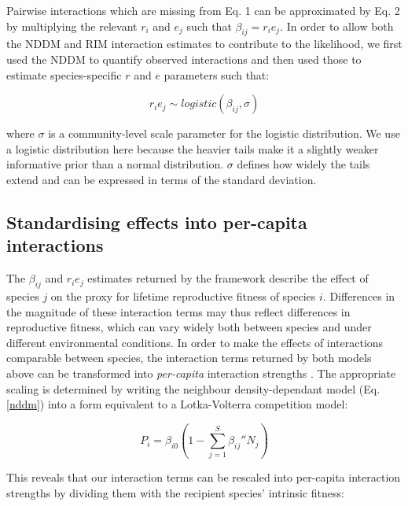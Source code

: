\documentclass[a4,12pt]{article}
\begin{document}
        Pairwise interactions which are missing from Eq. 1 can be approximated by Eq. 2 by multiplying the relevant $r_{i}$ and $e_{j}$ such that $\beta_{ij} = r_{i} e_{j}$. In order to allow both the NDDM and RIM interaction estimates to contribute to the likelihood, we first used the NDDM to quantify observed interactions and then used those to estimate species-specific $r$ and $e$ parameters such that: 
    
        \begin{equation}
        r_i e_j \sim logistic \left ( \beta_{ij}, \sigma \right )
        \label{unrealised}
        \end{equation}
    
        where $\sigma$ is a community-level scale parameter for the logistic distribution. We use a logistic distribution here because the heavier tails make it a slightly weaker informative prior than a normal distribution. $\sigma$ defines how widely the tails extend and can be expressed in terms of the standard deviation. 

    \subsection{Standardising effects into per-capita interactions}

        The $\beta_{ij}$ and $r_i e_j$ estimates returned by the framework describe the effect of species $j$ on the proxy for lifetime reproductive fitness of species $i$. Differences in the magnitude of these interaction terms may thus reflect differences in reproductive fitness, which can vary widely both between species and under different environmental conditions. In order to make the effects of interactions comparable between species, the interaction terms returned by both models above can be transformed into \textit{per-capita} interaction strengths \parencite{Godoy2014, Bimler2018}. The appropriate scaling is determined by writing the neighbour density-dependant model (Eq. \ref{nddm}) into a form equivalent to a Lotka-Volterra competition model: 

        \begin{equation}
        P_{i} = \beta_{i0} \left ( 1 - \sum_{j=1}^{S} {\beta_{ij}}'' N_{j} \right )
        \label{LVform}
        \end{equation}

        This reveals that our interaction terms can be rescaled into per-capita interaction strengths by dividing them with the recipient species' intrinsic fitness:  
\end{document}
